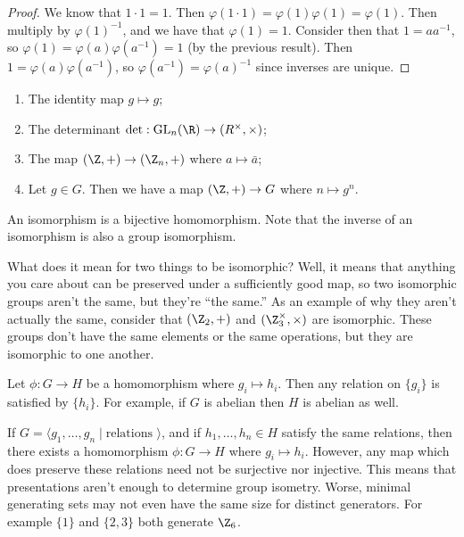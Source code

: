 \begin{proof}
We know that $1 \cdot 1 = 1$. Then $\varphi(1 \cdot 1) = \varphi(1)\varphi(1) = \varphi(1)$. Then multiply by $\varphi(1)^{-1}$, and we have that $\varphi(1) = 1$. Consider then that $1 = aa^{-1}$, so $\varphi(1) = \varphi(a)\varphi(a^{-1}) = 1$ (by the previous result). Then $1 = \varphi(a)\varphi(a^{-1})$, so $\varphi(a^{-1}) = \varphi(a)^{-1}$ since inverses are unique.
\end{proof}

\begin{example}
\begin{enumerate}
\item The identity map $g \mapsto g$;
\item The determinant $\det : \mathrm{GL}_n(\R) \to (R^\times, \times)$;
\item The map $(\Z, +) \to (\Z_n, +)$ where $a \mapsto \bar{a}$;
\item Let $g \in G$. Then we have a map $(\Z, +) \to G$ where $n \mapsto g^n$.
\end{enumerate}
\end{example}

\begin{definition}[Isomorphism]
An isomorphism is a bijective homomorphism. Note that the inverse of an isomorphism is also a group isomorphism.
\end{definition}

What does it mean for two things to be isomorphic? Well, it means that anything you care about can be preserved under a sufficiently good map, so two isomorphic groups aren't the same, but they're ``the same.'' As an example of why they aren't actually the same, consider that $(\Z_2, +)$ and $(\Z_3^\times, \times)$ are isomorphic. These groups don't have the same elements or the same operations, but they are isomorphic to one another.

\begin{lemma}
Let $\phi : G \to H$ be a homomorphism where $g_i \mapsto h_i$. Then any relation on $\{g_i\}$ is satisfied by $\{h_i\}$. For example, if $G$ is abelian then $H$ is abelian as well.
\end{lemma}

\begin{corollary}
If $G = \langle g_1,\dotsc,g_n \mid \text{relations } \rangle$, and if $h_1,\dotsc,h_n \in H$ satisfy the same relations, then there exists a homomorphism $\phi : G \to H$ where $g_i \mapsto h_i$. However, any map which does preserve these relations need not be surjective nor injective. This means that presentations aren't enough to determine group isometry. Worse, minimal generating sets may not even have the same size for distinct generators. For example $\{1\}$ and $\{2,3\}$ both generate $\Z_6$.
\end{corollary}

